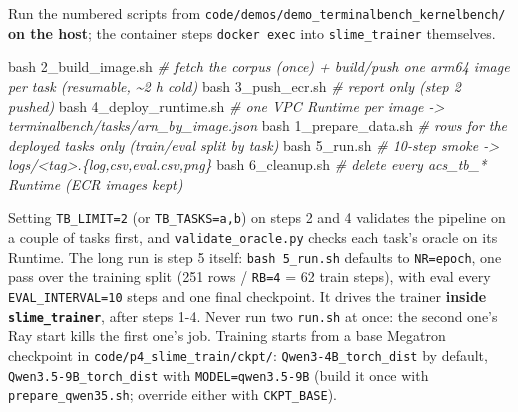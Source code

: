 \documentclass[
  paper=a4,
  ,captions=tableheading
]{scrartcl}
\newenvironment{Shaded}{}{}
\newcommand{\CommentTok}[1]{\textcolor[rgb]{0.38,0.63,0.69}{\textit{#1}}}
\newcommand{\FunctionTok}[1]{\textcolor[rgb]{0.02,0.16,0.49}{#1}}
\newcommand{\NormalTok}[1]{#1}
\begin{document}
Run the numbered scripts from
\texttt{code/demos/demo\_terminalbench\_kernelbench/} \textbf{on the
host}; the container steps \texttt{docker\ exec} into
\texttt{slime\_trainer} themselves.

\begin{Shaded}
\begin{Highlighting}[]
\FunctionTok{bash}\NormalTok{ 2\_build\_image.sh      }\CommentTok{\# fetch the corpus (once) + build/push one arm64 image per task (resumable, \textasciitilde{}2 h cold)}
\FunctionTok{bash}\NormalTok{ 3\_push\_ecr.sh         }\CommentTok{\# report only (step 2 pushed)}
\FunctionTok{bash}\NormalTok{ 4\_deploy\_runtime.sh   }\CommentTok{\# one VPC Runtime per image {-}\textgreater{} terminalbench/tasks/arn\_by\_image.json}
\FunctionTok{bash}\NormalTok{ 1\_prepare\_data.sh     }\CommentTok{\# rows for the deployed tasks only (train/eval split by task)}
\FunctionTok{bash}\NormalTok{ 5\_run.sh              }\CommentTok{\# 10{-}step smoke {-}\textgreater{} logs/\textless{}tag\textgreater{}.\{log,csv,eval.csv,png\}}
\FunctionTok{bash}\NormalTok{ 6\_cleanup.sh          }\CommentTok{\# delete every acs\_tb\_* Runtime (ECR images kept)}
\end{Highlighting}
\end{Shaded}

Setting \texttt{TB\_LIMIT=2} (or \texttt{TB\_TASKS=a,b}) on steps 2 and
4 validates the pipeline on a couple of tasks first, and
\texttt{validate\_oracle.py} checks each task's oracle on its Runtime.
The long run is step 5 itself: \texttt{bash\ 5\_run.sh} defaults to
\texttt{NR=epoch}, one pass over the training split (251 rows /
\texttt{RB=4} = 62 train steps), with eval every
\texttt{EVAL\_INTERVAL=10} steps and one final checkpoint. It drives the
trainer \textbf{inside \texttt{slime\_trainer}}, after steps 1-4. Never
run two \texttt{run.sh} at once: the second one's Ray start kills the
first one's job. Training starts from a base Megatron checkpoint in
\texttt{code/p4\_slime\_train/ckpt/}: \texttt{Qwen3-4B\_torch\_dist} by
default, \texttt{Qwen3.5-9B\_torch\_dist} with \texttt{MODEL=qwen3.5-9B}
(build it once with \texttt{prepare\_qwen35.sh}; override either with
\texttt{CKPT\_BASE}).
\end{document}
